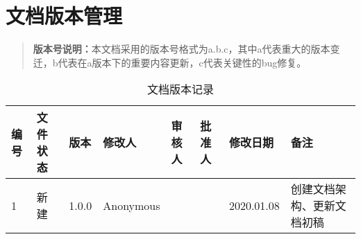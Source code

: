 
\chapter*{文档版本管理}
\label{cha:version_control}

\begin{quote}
  \kaishu
  \textbf{版本号说明：}本文档采用的版本号格式为a.b.c，其中a代表重大的版本变迁，b代表在a版本下的重要内容更新，c代表关键性的bug修复。
\end{quote}

\begin{table}[ht]
  \centering
  \caption{文档版本记录}
  \label{tab:version_control}
  \begin{tabular}{p{1cm}|p{1.5cm}|p{1.0cm}|p{1.5cm}|p{1.5cm}|p{1.5cm}|p{1.5cm}|p{3cm}}
    \hline\hline
    编号       & 文件状态 & 版本   &
    修改人     & 审核人   & 批准人 &
    修改日期   & 备注 \\
    \hline
    1          & 新建     & 1.0.0  &
    Anonymous  &          &        &
    2020.01.08 & 创建文档架构、更新文档初稿 \\
    \hline\hline
  \end{tabular}
\end{table}
